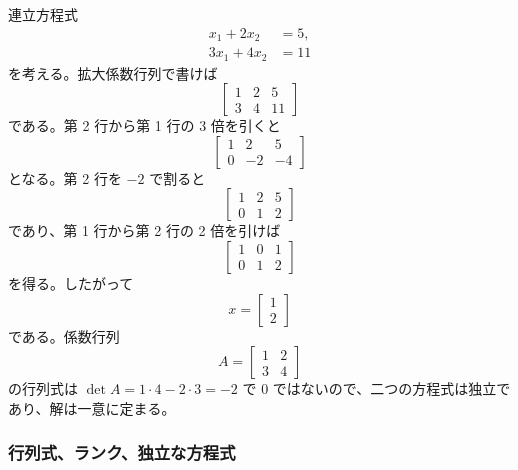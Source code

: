 \begin{example}[連立方程式を行基本変形で解く]
連立方程式
\begin{align}
  x_1+2x_2&=5,\\
  3x_1+4x_2&=11
\end{align}
を考える。拡大係数行列で書けば
\begin{equation}
  \left[
  \begin{array}{cc|c}
    1&2&5\\
    3&4&11
  \end{array}
  \right]
\end{equation}
である。第 2 行から第 1 行の 3 倍を引くと
\begin{equation}
  \left[
  \begin{array}{cc|c}
    1&2&5\\
    0&-2&-4
  \end{array}
  \right]
\end{equation}
となる。第 2 行を $-2$ で割ると
\begin{equation}
  \left[
  \begin{array}{cc|c}
    1&2&5\\
    0&1&2
  \end{array}
  \right]
\end{equation}
であり、第 1 行から第 2 行の 2 倍を引けば
\begin{equation}
  \left[
  \begin{array}{cc|c}
    1&0&1\\
    0&1&2
  \end{array}
  \right]
\end{equation}
を得る。したがって
\begin{equation}
  x=\begin{bmatrix}1\\2\end{bmatrix}
\end{equation}
である。係数行列
\begin{equation}
  A=
  \begin{bmatrix}
    1&2\\
    3&4
  \end{bmatrix}
\end{equation}
の行列式は $\det A=1\cdot4-2\cdot3=-2$ で 0 ではないので、二つの方程式は独立であり、解は一意に定まる。
\end{example}

\subsubsection{行列式、ランク、独立な方程式}

